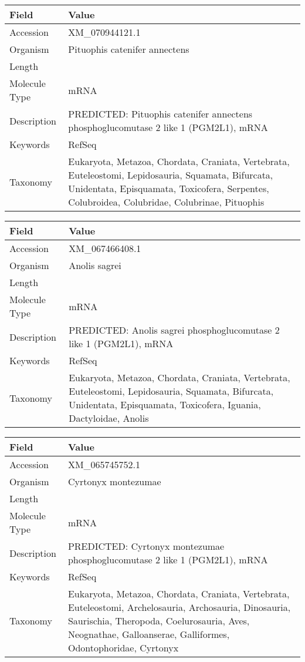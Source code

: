 \documentclass[10pt]{article}
\begin{document}
{\footnotesize
\begin{longtable}{>{\raggedright\arraybackslash}p{4.5cm} >{\raggedright\arraybackslash}p{11.5cm}}
\textbf{Field} & \textbf{Value} \\
\hline
Accession & XM\_070944121.1 \\
Organism & Pituophis catenifer annectens \\
Length & 1948 \\
Molecule Type & mRNA \\
Description & PREDICTED: Pituophis catenifer annectens phosphoglucomutase 2 like 1 (PGM2L1), mRNA \\
Keywords & RefSeq \\
Taxonomy & Eukaryota, Metazoa, Chordata, Craniata, Vertebrata, Euteleostomi, Lepidosauria, Squamata, Bifurcata, Unidentata, Episquamata, Toxicofera, Serpentes, Colubroidea, Colubridae, Colubrinae, Pituophis \\
\end{longtable}
}

{\footnotesize
\begin{longtable}{>{\raggedright\arraybackslash}p{4.5cm} >{\raggedright\arraybackslash}p{11.5cm}}
\textbf{Field} & \textbf{Value} \\
\hline
Accession & XM\_067466408.1 \\
Organism & Anolis sagrei \\
Length & 2795 \\
Molecule Type & mRNA \\
Description & PREDICTED: Anolis sagrei phosphoglucomutase 2 like 1 (PGM2L1), mRNA \\
Keywords & RefSeq \\
Taxonomy & Eukaryota, Metazoa, Chordata, Craniata, Vertebrata, Euteleostomi, Lepidosauria, Squamata, Bifurcata, Unidentata, Episquamata, Toxicofera, Iguania, Dactyloidae, Anolis \\
\end{longtable}
}

{\footnotesize
\begin{longtable}{>{\raggedright\arraybackslash}p{4.5cm} >{\raggedright\arraybackslash}p{11.5cm}}
\textbf{Field} & \textbf{Value} \\
\hline
Accession & XM\_065745752.1 \\
Organism & Cyrtonyx montezumae \\
Length & 2112 \\
Molecule Type & mRNA \\
Description & PREDICTED: Cyrtonyx montezumae phosphoglucomutase 2 like 1 (PGM2L1), mRNA \\
Keywords & RefSeq \\
Taxonomy & Eukaryota, Metazoa, Chordata, Craniata, Vertebrata, Euteleostomi, Archelosauria, Archosauria, Dinosauria, Saurischia, Theropoda, Coelurosauria, Aves, Neognathae, Galloanserae, Galliformes, Odontophoridae, Cyrtonyx \\
\end{longtable}
}
\end{document}
